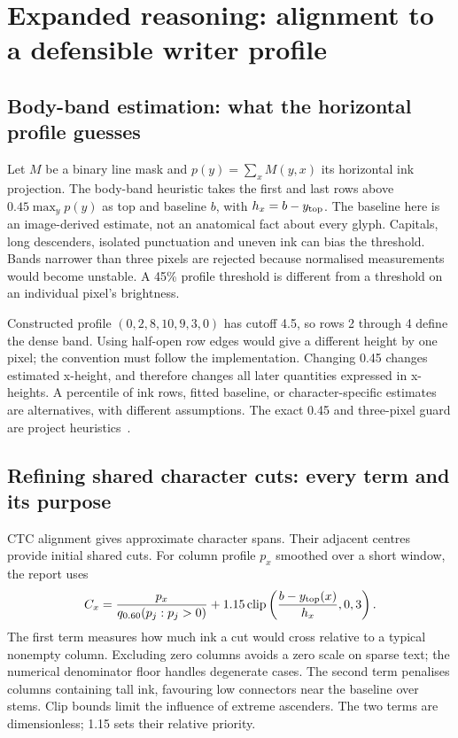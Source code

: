\section{Expanded reasoning: alignment to a defensible writer profile}
\label{sec:expand-style}
\subsection{Body-band estimation: what the horizontal profile guesses}
Let $M$ be a binary line mask and $p(y)=\sum_x M(y,x)$ its horizontal ink
projection. The body-band heuristic takes the first and last rows above
$0.45\max_y p(y)$ as top and baseline $b$, with $h_x=b-y_{\rm top}$.
The baseline here is an image-derived estimate, not an anatomical fact about
every glyph. Capitals, long descenders, isolated punctuation and uneven ink
can bias the threshold. Bands narrower than three pixels are rejected because
normalised measurements would become unstable. A 45\% profile threshold is
different from a threshold on an individual pixel's brightness.

Constructed profile $(0,2,8,10,9,3,0)$ has cutoff 4.5, so rows 2 through 4
define the dense band. Using half-open row edges would give a different
height by one pixel; the convention must follow the implementation. Changing
0.45 changes estimated x-height, and therefore changes all later quantities
expressed in x-heights. A percentile of ink rows, fitted baseline, or
character-specific estimates are alternatives, with different assumptions.
The exact 0.45 and three-pixel guard are project heuristics~\cite{code2026}.

\subsection{Refining shared character cuts: every term and its purpose}
CTC alignment gives approximate character spans. Their adjacent centres
provide initial shared cuts. For column profile $p_x$ smoothed over a short
window, the report uses
\[
C_x={p_x\over q_{0.60}(p_j:p_j>0)}+
1.15\operatorname{clip}\left({b-y_{\rm top}(x)\over h_x},0,3\right).
\]
The first term measures how much ink a cut would cross relative to a typical
nonempty column. Excluding zero columns avoids a zero scale on sparse text;
the numerical denominator floor handles degenerate cases. The second term
penalises columns containing tall ink, favouring low connectors near the
baseline over stems. Clip bounds limit the influence of extreme ascenders.
The two terms are dimensionless; 1.15 sets their relative priority.

